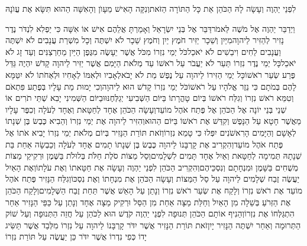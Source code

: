 \documentclass[../main/main.tex]{subfiles}
\begin{document}
\begin{multicols}{\ncols}
לִפְנֵי יַהְוֶה וְעָשָׂה לָהּ הַכֹּהֵן אֵת כָּל הַתּוֹרָה הַזֹּאת\PreVerseSpace{}וְנִקָּה הָאִישׁ מֵעָוֺן וְהָאִשָּׁה הַהוּא תִּשָּׂא אֶת עֲוֺנָהּ\OpenSection{}\par
{}וַיְדַבֵּר יַהְוֶה אֶל מֹשֶׁה לֵּאמֹר\PreVerseSpace{}דַּבֵּר אֶל בְּנֵי יִשְׂרָאֵל וְאָמַרְתָּ אֲלֵהֶם אִישׁ אוֹ אִשָּׁה כִּי יַפְלִא לִנְדֹּר נֶדֶר נָזִיר לְהַזִּיר לַיהוָה\PreVerseSpace{}מִיַּיִן וְשֵׁכָר יַזִּיר חֹמֶץ יַיִן וְחֹמֶץ שֵׁכָר לֹא יִשְׁתֶּה וְכָל מִשְׁרַת עֲנָבִים לֹא יִשְׁתֶּה וַעֲנָבִים לַחִים וִיבֵשִׁים לֹא יֹאכֵל\PreVerseSpace{}כֹּל יְמֵי נִזְרוֹ מִכֹּל אֲשֶׁר יֵעָשֶׂה מִגֶּפֶן הַיַּיִן מֵחַרְצַנִּים וְעַד זָג לֹא יֹאכֵל\PreVerseSpace{}כָּל יְמֵי נֶדֶר נִזְרוֹ תַּעַר לֹא יַעֲבֹר עַל רֹאשׁוֹ עַד מְלֹאת הַיָּמִם אֲשֶׁר יַזִּיר לַיהוָה קָדֹשׁ יִהְיֶה גַּדֵּל פֶּרַע שְׂעַר רֹאשׁוֹ\PreVerseSpace{}כָּל יְמֵי הַזִּירוֹ לַיהוָה עַל נֶפֶשׁ מֵת לֹא יָבֹא\PreVerseSpace{}לְאָבִיו וּלְאִמּוֹ לְאָחִיו וּלְאַחֹתוֹ לֹא יִטַּמָּא לָהֶם בְּמֹתָם כִּי נֵזֶר אֱלֹהָיו עַל רֹאשׁוֹ\PreVerseSpace{}כֹּל יְמֵי נִזְרוֹ קָדֹשׁ הוּא לַיהוָה\PreVerseSpace{}וְכִי יָמוּת מֵת עָלָיו בְּפֶתַע פִּתְאֹם וְטִמֵּא רֹאשׁ נִזְרוֹ וְגִלַּח רֹאשׁוֹ בְּיוֹם טָהֳרָתוֹ בַּיּוֹם הַשְּׁבִיעִי יְגַלְּחֶנּוּ\PreVerseSpace{}וּבַיּוֹם הַשְּׁמִינִי יָבִא שְׁתֵּי תֹרִים אוֹ שְׁנֵי בְּנֵי יוֹנָה אֶל הַכֹּהֵן אֶל פֶּתַח אֹהֶל מוֹעֵד\PreVerseSpace{}וְעָשָׂה הַכֹּהֵן אֶחָד לְחַטָּאת וְאֶחָד לְעֹלָה וְכִפֶּר עָלָיו מֵאֲשֶׁר חָטָא עַל הַנָּפֶשׁ וְקִדַּשׁ אֶת רֹאשׁוֹ בַּיּוֹם הַהוּא\PreVerseSpace{}וְהִזִּיר לַיהוָה אֶת יְמֵי נִזְרוֹ וְהֵבִיא כֶּבֶשׂ בֶּן שְׁנָתוֹ לְאָשָׁם וְהַיָּמִים הָרִאשֹׁנִים יִפְּלוּ כִּי טָמֵא נִזְרוֹ\PreVerseSpace{}וְזֹאת תּוֹרַת הַנָּזִיר בְּיוֹם מְלֹאת יְמֵי נִזְרוֹ יָבִיא אֹתוֹ אֶל פֶּתַח אֹהֶל מוֹעֵד\PreVerseSpace{}וְהִקְרִיב אֶת קָרְבָּנוֹ לַיהוָה כֶּבֶשׂ בֶּן שְׁנָתוֹ תָמִים אֶחָד לְעֹלָה וְכַבְשָׂה אַחַת בַּת שְׁנָתָהּ תְּמִימָה לְחַטָּאת וְאַיִל אֶחָד תָּמִים לִשְׁלָמִים\PreVerseSpace{}וְסַל מַצּוֹת סֹלֶת חַלֹּת בְּלוּלֹת בַּשֶּׁמֶן וּרְקִיקֵי מַצּוֹת מְשֻׁחִים בַּשָּׁמֶן וּמִנְחָתָם וְנִסְכֵּיהֶם\PreVerseSpace{}וְהִקְרִיב הַכֹּהֵן לִפְנֵי יַהְוֶה וְעָשָׂה אֶת חַטָּאתוֹ וְאֶת עֹלָתוֹ\PreVerseSpace{}וְאֶת הָאַיִל יַעֲשֶׂה זֶבַח שְׁלָמִים לַיהוָה עַל סַל הַמַּצּוֹת וְעָשָׂה הַכֹּהֵן אֶת מִנְחָתוֹ וְאֶת נִסְכּוֹ\PreVerseSpace{}וְגִלַּח הַנָּזִיר פֶּתַח אֹהֶל מוֹעֵד אֶת רֹאשׁ נִזְרוֹ וְלָקַח אֶת שְׂעַר רֹאשׁ נִזְרוֹ וְנָתַן עַל הָאֵשׁ אֲשֶׁר תַּחַת זֶבַח הַשְּׁלָמִים\PreVerseSpace{}וְלָקַח הַכֹּהֵן אֶת הַזְּרֹעַ בְּשֵׁלָה מִן הָאַיִל וְחַלַּת מַצָּה אַחַת מִן הַסַּל וּרְקִיק מַצָּה אֶחָד וְנָתַן עַל כַּפֵּי הַנָּזִיר אַחַר הִתְגַּלְּחוֹ אֶת נִזְרוֹ\PreVerseSpace{}וְהֵנִיף אוֹתָם הַכֹּהֵן תְּנוּפָה לִפְנֵי יַהְוֶה קֹדֶשׁ הוּא לַכֹּהֵן עַל חֲזֵה הַתְּנוּפָה וְעַל שׁוֹק הַתְּרוּמָה וְאַחַר יִשְׁתֶּה הַנָּזִיר יָיִן\PreVerseSpace{}זֹאת תּוֹרַת הַנָּזִיר אֲשֶׁר יִדֹּר קָרְבָּנוֹ לַיהוָה עַל נִזְרוֹ מִלְּבַד אֲשֶׁר תַּשִּׂיג יָדוֹ כְּפִי נִדְרוֹ אֲשֶׁר יִדֹּר כֵּן יַעֲשֶׂה עַל תּוֹרַת נִזְרוֹ\OpenSection{}\par

\end{multicols}
\end{document}
